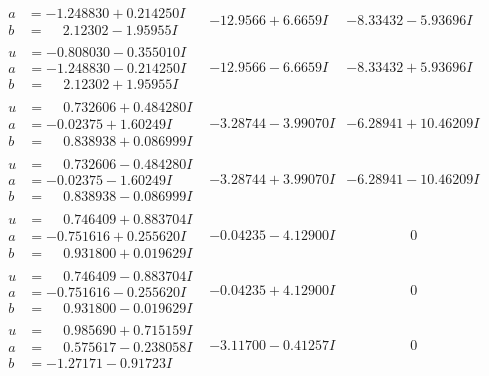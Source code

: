 \documentclass[1p]{elsarticle_modified}
\theoremstyle{definition}
\begin{document}
$$\begin{array}{c|c|c}
\begin{aligned}
a &= -1.248830 + 0.214250 I \\
b &= \phantom{-}2.12302 - 1.95955 I\end{aligned}
 & -12.9566 + 6.6659 I & -8.33432 - 5.93696 I \\ \hline\begin{aligned}
u &= -0.808030 - 0.355010 I \\
a &= -1.248830 - 0.214250 I \\
b &= \phantom{-}2.12302 + 1.95955 I\end{aligned}
 & -12.9566 - 6.6659 I & -8.33432 + 5.93696 I \\ \hline\begin{aligned}
u &= \phantom{-}0.732606 + 0.484280 I \\
a &= -0.02375 + 1.60249 I \\
b &= \phantom{-}0.838938 + 0.086999 I\end{aligned}
 & -3.28744 - 3.99070 I & -6.28941 + 10.46209 I \\ \hline\begin{aligned}
u &= \phantom{-}0.732606 - 0.484280 I \\
a &= -0.02375 - 1.60249 I \\
b &= \phantom{-}0.838938 - 0.086999 I\end{aligned}
 & -3.28744 + 3.99070 I & -6.28941 - 10.46209 I \\ \hline\begin{aligned}
u &= \phantom{-}0.746409 + 0.883704 I \\
a &= -0.751616 + 0.255620 I \\
b &= \phantom{-}0.931800 + 0.019629 I\end{aligned}
 & -0.04235 - 4.12900 I & \phantom{-0.000000 } 0 \\ \hline\begin{aligned}
u &= \phantom{-}0.746409 - 0.883704 I \\
a &= -0.751616 - 0.255620 I \\
b &= \phantom{-}0.931800 - 0.019629 I\end{aligned}
 & -0.04235 + 4.12900 I & \phantom{-0.000000 } 0 \\ \hline\begin{aligned}
u &= \phantom{-}0.985690 + 0.715159 I \\
a &= \phantom{-}0.575617 - 0.238058 I \\
b &= -1.27171 - 0.91723 I\end{aligned}
 & -3.11700 - 0.41257 I & \phantom{-0.000000 } 0 \\ \hline\begin{aligned}

\end{aligned}
\end{array}$$
\end{document}
